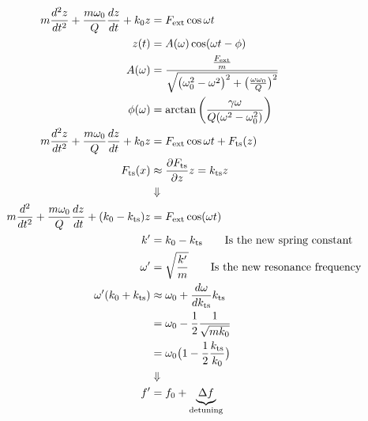 \begin{columns}
{\begin{align*}
        m\frac{d^2z}{dt^{2}}+\frac{m\omega_{0}}{Q}\frac{dz}{dt} + k_{0}z&=F_{\textup{ext}}\cos\omega t\\
        z(t)&=A(\omega)\cos(\omega t-\phi)\\
        A(\omega)&=\frac{\frac{F_{\textup{ext}}}{m}}{\sqrt{\big(\omega_{0}^{2}-\omega^2\big)^2+\big(\frac{\omega\omega_{0}}{Q}\big)^{2}}}\\
        \phi(\omega) &= \arctan\bigg(\frac{\gamma\omega}{Q(\omega^2-\omega_0^2)}\bigg)\\
        m\frac{d^2z}{dt^{2}}+\frac{m\omega_{0}}{Q}\frac{dz}{dt} + k_{0}z&=F_{\textup{ext}}\cos\omega t +F_{\textup{ts}}(z)\\
        F_{\textup{ts}}(x)&\approx \frac{\partial F_{\textup{ts}}}{\partial z   }z =k_{\textup{ts}}z\\
        &\Downarrow\\
        m\frac{d^2}{dt^2}+\frac{m\omega_0}{Q}\frac{dz}{dt}+(k_{0}-k_{\textup{ts}})z&=F_{\textup{ext}}\cos(\omega t)\\
        k' &= k_{0}-k_{\textup{ts}}\qquad\textup{Is the new spring constant}\\
        \omega'&=\sqrt{\frac{k'}{m}}\qquad\textup{Is the new resonance frequency}\\
        \omega'(k_{0}+k_{\textup{ts}}) &\approx\omega_{0}+\frac{d\omega}{dk_{\textup{ts}}}k_{\textup{ts}}\\
        &=\omega_{0}-\frac{1}{2}\frac{1}{\sqrt{mk_{0}}}\\
        &=\omega_{0}\big(1-\frac{1}{2}\frac{k_{\textup{ts}}}{k_{0}}\big)\\
        &\Downarrow\\
        f'&=f_{0}+\underbrace{\Delta f}_{\textup{detuning}}
\end{align*}
        }
\end{columns}


